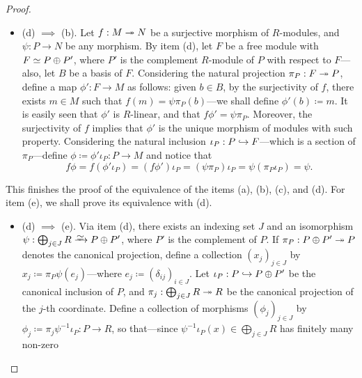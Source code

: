 \begin{proof}
\begin{itemize}
        \item (d) \(\implies\) (b). Let \(f: M \twoheadrightarrow N\) be a surjective morphism of
              \(R\)-modules, and \(\psi: P \to N\) be any morphism. By item (d), let \(F\)
              be a free module with \(F \simeq P \oplus P'\), where \(P'\) is the complement
              \(R\)-module of \(P\) with respect to \(F\)---also, let \(B\) be a basis of
              \(F\). Considering the natural projection \(\pi_P: F \twoheadrightarrow P\), define a map
              \(\phi': F \to M\) as follows: given \(b \in B\), by the surjectivity of
              \(f\), there exists \(m \in M\) such that \(f(m) = \psi \pi_P(b)\)---we shall
              define \(\phi'(b) \coloneq m\). It is easily seen that \(\phi'\) is
              \(R\)-linear, and that \(f \phi' = \psi \pi_P\). Moreover, the surjectivity of
              \(f\) implies that \(\phi'\) is the unique morphism of modules with such
              property. Considering the natural inclusion \(\iota_P: P \hookrightarrow F\)---which is a
              section of \(\pi_P\)---define \(\phi \coloneq \phi' \iota_P: P \to M\) and
              notice that
              \[
                  f \phi
                  = f (\phi' \iota_P)
                  = (f \phi') \iota_P
                  = (\psi \pi_P) \iota_P
                  = \psi (\pi_P \iota_P)
                  = \psi.
              \]
    \end{itemize}
    This finishes the proof of the equivalence of the items (a), (b), (c), and
    (d). For item (e), we shall prove its equivalence with (d).
    \begin{itemize}\setlength\itemsep{0em}
        \item (d) \(\implies\) (e). Via item (d), there exists an indexing set \(J\) and
              an isomorphism \(\psi: \bigoplus_{j \in J} R \isoto P \oplus P'\), where
              \(P'\) is the complement of \(P\). If \(\pi_P: P \oplus P' \twoheadrightarrow P\) denotes
              the canonical projection, define a collection \((x_j)_{j \in J}\) by
              \(x_j \coloneq \pi_P \psi(e_j)\)---where
              \(e_j \coloneq (\delta_{ij})_{i \in J}\). Let \(\iota_P: P \hookrightarrow P \oplus P'\)
              be the canonical inclusion of \(P\), and
              \(\pi_j: \bigoplus_{j \in J} R \twoheadrightarrow R\) be the canonical projection of the
              \(j\)-th coordinate. Define a collection of morphisms \((\phi_j)_{j \in J}\)
              by \(\phi_j \coloneq \pi_j \psi^{-1} \iota_P: P \to R\), so that---since
              \(\psi^{-1} \iota_P(x) \in \bigoplus_{j \in J} R\) has finitely many non-zero

\end{itemize}
\end{proof}
